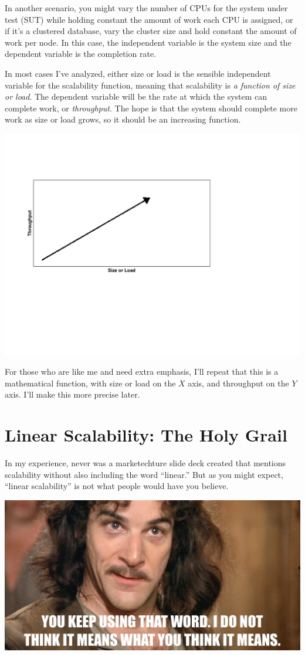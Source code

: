 \documentclass{vivid_layout}
\begin{document}
In another scenario, you might vary the number of CPUs for the system under test
(SUT) while holding constant the amount of work each CPU is assigned, or if it's
a clustered database, vary the cluster size and hold constant the amount of work
per node. In this case, the independent variable is the system size and the
dependent variable is the completion rate.

In most cases I've analyzed, either size or load is the sensible independent
variable for the scalability function, meaning that scalability is {\itshape a
function of size or load}.  The dependent variable will be the rate at which the
system can complete work, or {\itshape throughput}. The hope is that the system
should complete more work as size or load grows, so it should be an increasing
function.
\begin{center}
\includegraphics[width=.85\linewidth]{scalability/size-vs-load}
\end{center}

For those who are like me and need extra emphasis, I'll repeat that this is a
mathematical function, with size or load on the $X$ axis, and throughput on the
$Y$ axis. I'll make this more precise later.

\section{Linear Scalability: The Holy Grail}

In my experience, never was a marketechture slide deck created that mentions
scalability without also including the word ``linear.'' But as you might expect,
``linear scalability'' is not what people would have you believe.
\begin{center}
\includegraphics[width=.85\linewidth]{scalability/inigo}
\end{center}
\end{document}
